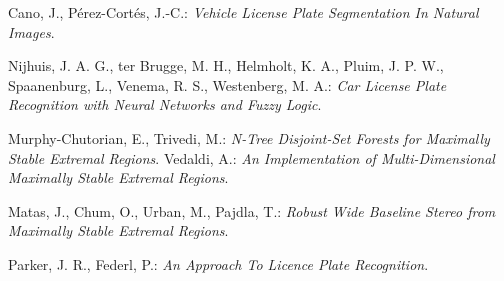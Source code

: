 
\begin{thebibliography}{99}

 Cano, J., Pérez-Cortés, J.-C.: \textit{Vehicle License Plate Segmentation In Natural Images}.

 Nijhuis, J. A. G., ter Brugge, M. H., Helmholt, K. A., Pluim, J. P. W., Spaanenburg, L., Venema, R. S., Westenberg, M. A.: \textit{Car License Plate Recognition with Neural Networks and Fuzzy Logic}.






 Murphy-Chutorian, E., Trivedi, M.: \textit{N-Tree Disjoint-Set Forests for Maximally Stable Extremal Regions}.
 Vedaldi, A.: \textit{An Implementation of Multi-Dimensional Maximally Stable Extremal Regions}.

 Matas, J., Chum, O., Urban, M., Pajdla, T.: \textit{Robust Wide Baseline Stereo from Maximally Stable Extremal Regions}.

 Parker, J. R., Federl, P.: \textit{An Approach To Licence Plate Recognition}.


\end{thebibliography}